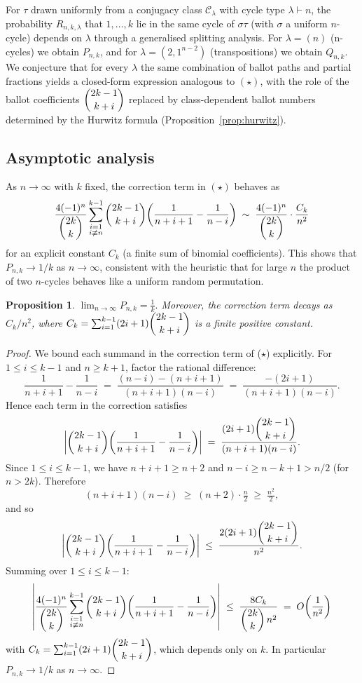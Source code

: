 \documentclass[12pt,a4paper]{article}
\newtheorem{proposition}[theorem]{Proposition}
\theoremstyle{definition}
\renewcommand{\binom}[2]{\dbinom{#1}{#2}}
\begin{document}
For $\tau$ drawn uniformly from a conjugacy class $\mathcal{C}_\lambda$
with cycle type $\lambda\vdash n$, the probability $R_{n,k,\lambda}$
that $1,\dots,k$ lie in the same cycle of $\sigma\tau$ (with $\sigma$
a uniform $n$-cycle) depends on $\lambda$ through a generalised
splitting analysis.  For $\lambda=(n)$ (n-cycles) we obtain $P_{n,k}$,
and for $\lambda=(2,1^{n-2})$ (transpositions) we obtain $Q_{n,k}$.
We conjecture that for every $\lambda$ the same combination of ballot
paths and partial fractions yields a closed-form expression analogous
to $(\star)$, with the role of the ballot coefficients $\binom{2k-1}{k+i}$
replaced by class-dependent ballot numbers determined by the
Hurwitz formula (Proposition~\ref{prop:hurwitz}).

\subsection{Asymptotic analysis}

As $n\to\infty$ with $k$ fixed, the correction term in $(\star)$
behaves as
\[
\frac{4(-1)^n}{\binom{2k}{k}}
\sum_{\substack{i=1\\i\not\equiv n}}^{k-1}
\binom{2k-1}{k+i}
\!\left(\frac{1}{n+i+1}-\frac{1}{n-i}\right)
\;\sim\;
\frac{4(-1)^n}{\binom{2k}{k}}
\cdot
\frac{C_k}{n^2}
\]
for an explicit constant $C_k$ (a finite sum of binomial coefficients).
This shows that $P_{n,k}\to 1/k$ as $n\to\infty$, consistent with the
heuristic that for large $n$ the product of two $n$-cycles behaves
like a uniform random permutation.

\begin{proposition}
\label{prop:asymptotic}
$\displaystyle\lim_{n\to\infty} P_{n,k} = \frac{1}{k}.$
Moreover, the correction term decays as $C_k/n^2$, where
$C_k = \sum_{i=1}^{k-1}(2i+1)\binom{2k-1}{k+i}$ is a finite
positive constant.
\end{proposition}

\begin{proof}
We bound each summand in the correction term of ($\star$) explicitly.
For $1\le i\le k-1$ and $n\ge k+1$, factor the rational difference:
\[
\frac{1}{n+i+1}-\frac{1}{n-i}
\;=\;
\frac{(n-i)-(n+i+1)}{(n+i+1)(n-i)}
\;=\;
\frac{-(2i+1)}{(n+i+1)(n-i)}.
\]
Hence each term in the correction satisfies
\[
\left|\binom{2k-1}{k+i}\!\left(\frac{1}{n+i+1}-\frac{1}{n-i}\right)\right|
\;=\;
\frac{(2i+1)\binom{2k-1}{k+i}}{(n+i+1)(n-i)}.
\]
Since $1\le i\le k-1$, we have $n+i+1\ge n+2$ and $n-i\ge n-k+1>n/2$
(for $n>2k$).  Therefore
\[
(n+i+1)(n-i)\;\ge\;(n+2)\cdot\tfrac{n}{2}\;\ge\;\tfrac{n^2}{2},
\]
and so
\[
\left|\binom{2k-1}{k+i}\!\left(\frac{1}{n+i+1}-\frac{1}{n-i}\right)\right|
\;\le\;
\frac{2(2i+1)\binom{2k-1}{k+i}}{n^2}.
\]
Summing over $1\le i\le k-1$:
\[
\left|\frac{4(-1)^n}{\binom{2k}{k}}
\sum_{\substack{i=1\\i\not\equiv n}}^{k-1}
\binom{2k-1}{k+i}\!\left(\frac{1}{n+i+1}-\frac{1}{n-i}\right)\right|
\;\le\;
\frac{8C_k}{\binom{2k}{k}\,n^2}
\;=\;
O\!\left(\frac{1}{n^2}\right)
\]
with $C_k=\sum_{i=1}^{k-1}(2i+1)\binom{2k-1}{k+i}$, which depends
only on $k$.  In particular $P_{n,k}\to 1/k$ as $n\to\infty$.
\end{proof}
\end{document}
